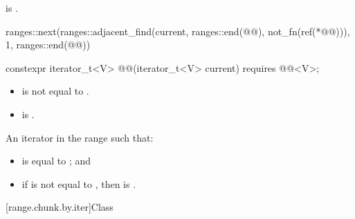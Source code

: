 \begin{itemdescr}
\pnum
\expects
{} is .

\pnum
\returns
\begin{codeblock}
ranges::next(ranges::adjacent_find(current, ranges::end(@@), not_fn(ref(*@@))),
             1, ranges::end(@@))
\end{codeblock}
\end{itemdescr}

%
\begin{itemdecl}
constexpr iterator_t<V> @@(iterator_t<V> current) requires @@<V>;
\end{itemdecl}

\begin{itemdescr}
\pnum
\expects
\begin{itemize}
\item
{} is not equal to .
\item
{} is .
\end{itemize}

\pnum
\returns
An iterator 
in the range  such that:
\begin{itemize}
\item
{} is equal to ; and
\item
if  is not equal to ,
then 
is .
\end{itemize}
\end{itemdescr}

[range.chunk.by.iter]{Class }

